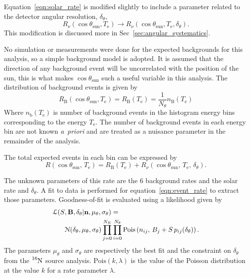 Equation~\eqref{eqn:solar_rate} is modified slightly to include a parameter
related to the detector angular resolution, $\delta_{\theta}$,
\begin{equation}
R_{\nu}(\cos\theta_{\mathrm{sun}}, T_{\mathrm{e}}) \rightarrow
    R_{\nu}(\cos\theta_{\mathrm{sun}}, T_{\mathrm{e}}, \delta_{\theta})\text{.}
\end{equation}
This modification is discussed more in Sec~\ref{sec:angular_systematics}.

No simulation or measurements were done for the expected backgrounds for this analysis,
so a simple background model is adopted.
It is assumed that the direction of any background event will be uncorrelated
with the position of the sun, this is what makes $\cos\theta_{\mathrm{sun}}$ such a
useful variable in this analysis.
The distribution of background events is given by
\begin{equation}
    R_{\mathrm{B}}(\cos\theta_{\mathrm{sun}}, T_{\mathrm{e}}) =
    R_{\mathrm{B}}(T_{\mathrm{e}}) = \frac{1}{N_\theta}n_{\mathrm{B}}(T_{\mathrm{e}})
\end{equation}
Where $n_{\mathrm{b}}(T_{\mathrm{e}})$ is number of background events in the
histogram energy bins corresponding to the energy $T_{\mathrm{e}}$.
The number of background events in each energy bin are not known \textit{a~priori}
and are treated as a nuisance parameter in the remainder of the analysis.

The total expected events in each bin can be expressed by
\begin{equation}
    R(\cos\theta_{\mathrm{sun}}\text{, }T_{\mathrm{e}}) =
    R_{\mathrm{B}}(T_{\mathrm{e}}) + R_{\nu}(\cos\theta_{\mathrm{sun}}\text{, }T_{\mathrm{e}}\text{, }\delta_{\theta})\text{.}
    \label{eqn:event_rate}
\end{equation}

The unknown parameters of this rate are the 6 background rates and the solar
rate and $\delta_{\theta}$.
A fit to data is performed for equation~\eqref{eqn:event_rate} to extract
those parameters.
Goodness-of-fit is evaluated using a likelihood given by
\begin{align}
    \mathcal{L}(S&, \bold{B}, \delta_{\theta} | \bold{n}, \mu_{\theta}, \sigma_{\theta}) = \nonumber\\
    &\mathcal{N}(\delta_{\theta}, \mu_{\theta}, \sigma_\theta)
    \prod_{j=0}^{N_E}\prod^{N_{\theta}}_{i=0} \text{Pois}\left(n_{ij},\, B_{j} + S\,p_{ij}(\delta_{\theta})\right)\text{.}
    \label{eq:ll}
\end{align}
The parameters $\mu_{\theta}$ and $\sigma_{\theta}$ are respectively the best
fit and the constraint on $\delta_{\theta}$ from the $\ce{^{16}N}$ source
analysis.
$\text{Pois}\left(k, \lambda \right)$ is the value of the Poisson distribution
at the value $k$ for a rate parameter $\lambda$.
